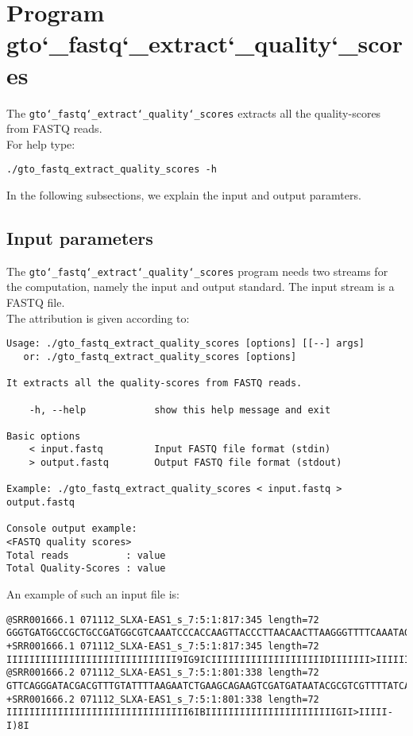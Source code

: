 \section{Program gto\char`_fastq\char`_extract\char`_quality\char`_scores}
The \texttt{gto\char`_fastq\char`_extract\char`_quality\char`_scores} extracts all the quality-scores from FASTQ reads.\\
For help type:
\begin{lstlisting}
./gto_fastq_extract_quality_scores -h
\end{lstlisting}
In the following subsections, we explain the input and output paramters.

\subsection*{Input parameters}

The \texttt{gto\char`_fastq\char`_extract\char`_quality\char`_scores} program needs two streams for the computation, namely the input and output standard. The input stream is a FASTQ file.\\
The attribution is given according to:
\begin{lstlisting}
Usage: ./gto_fastq_extract_quality_scores [options] [[--] args]
   or: ./gto_fastq_extract_quality_scores [options]

It extracts all the quality-scores from FASTQ reads.

    -h, --help            show this help message and exit

Basic options
    < input.fastq         Input FASTQ file format (stdin)
    > output.fastq        Output FASTQ file format (stdout)

Example: ./gto_fastq_extract_quality_scores < input.fastq > output.fastq

Console output example:
<FASTQ quality scores>
Total reads          : value
Total Quality-Scores : value
\end{lstlisting}
An example of such an input file is:
\begin{lstlisting}
@SRR001666.1 071112_SLXA-EAS1_s_7:5:1:817:345 length=72
GGGTGATGGCCGCTGCCGATGGCGTCAAATCCCACCAAGTTACCCTTAACAACTTAAGGGTTTTCAAATAGA
+SRR001666.1 071112_SLXA-EAS1_s_7:5:1:817:345 length=72
IIIIIIIIIIIIIIIIIIIIIIIIIIIIII9IG9ICIIIIIIIIIIIIIIIIIIIIDIIIIIII>IIIIII/
@SRR001666.2 071112_SLXA-EAS1_s_7:5:1:801:338 length=72
GTTCAGGGATACGACGTTTGTATTTTAAGAATCTGAAGCAGAAGTCGATGATAATACGCGTCGTTTTATCAT
+SRR001666.2 071112_SLXA-EAS1_s_7:5:1:801:338 length=72
IIIIIIIIIIIIIIIIIIIIIIIIIIIIIIII6IBIIIIIIIIIIIIIIIIIIIIIIIGII>IIIII-I)8I
\end{lstlisting}

